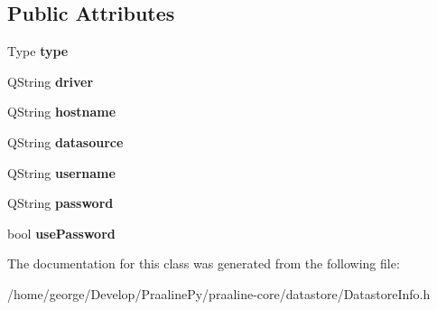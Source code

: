 \subsection*{Public Attributes}
\begin{DoxyCompactItemize}
\item 
\mbox{\label{class_datastore_info_a58c34f47ef1a9ed785237aceb38fc01b}} 
Type {\bfseries type}
\item 
\mbox{\label{class_datastore_info_a6fd9cab603c209ecf7962b8e54273885}} 
Q\+String {\bfseries driver}
\item 
\mbox{\label{class_datastore_info_acc642a6098878b14cb3abab25b29f310}} 
Q\+String {\bfseries hostname}
\item 
\mbox{\label{class_datastore_info_a8153190b6af637fe6c0c9d5e87201b8b}} 
Q\+String {\bfseries datasource}
\item 
\mbox{\label{class_datastore_info_aa03e020c738ae76d94118e63c80ff48a}} 
Q\+String {\bfseries username}
\item 
\mbox{\label{class_datastore_info_a7c75852ff6d0e50d8a91a2fbb07224f9}} 
Q\+String {\bfseries password}
\item 
\mbox{\label{class_datastore_info_a35ed32b577354fadfe0140559908ffa7}} 
bool {\bfseries use\+Password}
\end{DoxyCompactItemize}


The documentation for this class was generated from the following file\+:\begin{DoxyCompactItemize}
\item 
/home/george/\+Develop/\+Praaline\+Py/praaline-\/core/datastore/Datastore\+Info.\+h\end{DoxyCompactItemize}
